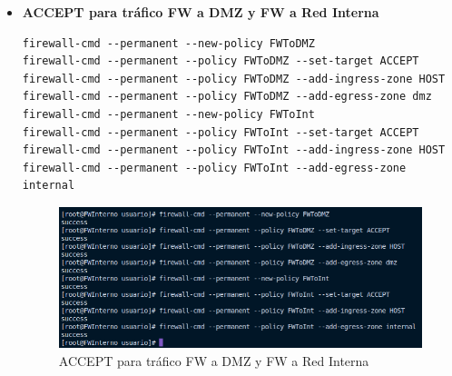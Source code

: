 \documentclass[11pt]{report}
\begin{document}
\cleardoublepage

\begin{itemize}
  \item \textbf{ACCEPT para tráfico FW a DMZ y FW a Red Interna}
  \begin{verbatim}
firewall-cmd --permanent --new-policy FWToDMZ
firewall-cmd --permanent --policy FWToDMZ --set-target ACCEPT
firewall-cmd --permanent --policy FWToDMZ --add-ingress-zone HOST
firewall-cmd --permanent --policy FWToDMZ --add-egress-zone dmz
firewall-cmd --permanent --new-policy FWToInt
firewall-cmd --permanent --policy FWToInt --set-target ACCEPT
firewall-cmd --permanent --policy FWToInt --add-ingress-zone HOST
firewall-cmd --permanent --policy FWToInt --add-egress-zone internal
  \end{verbatim}
  \begin{figure}[H]
    \centering
    \includegraphics[scale=0.55]{img/accept_fw_to_dmz_fw_Int.png}
    \caption{ACCEPT para tráfico FW a DMZ y FW a Red Interna}
    \label{fig:ACCEPT para tráfico FW a DMZ y FW a Red Interna}
  \end{figure}


\end{itemize}
\end{document}
